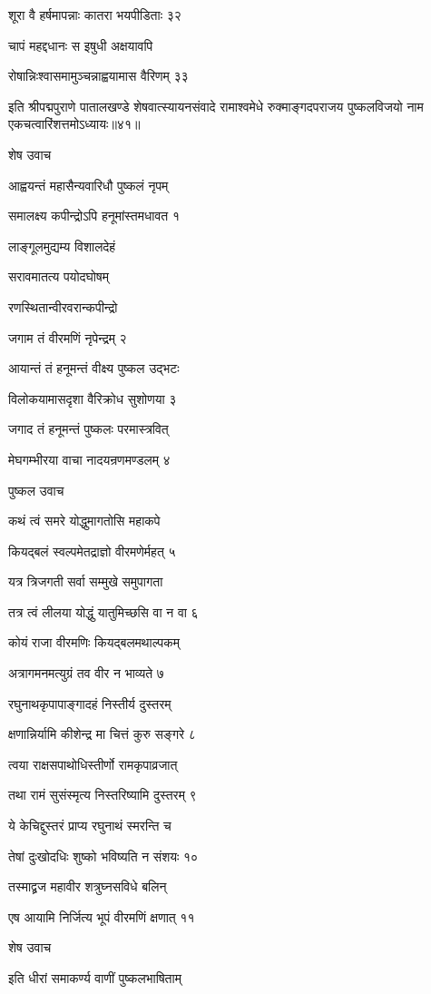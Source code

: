 शूरा वै हर्षमापन्नाः कातरा भयपीडिताः ३२

चापं महद्दधानः स इषुधी अक्षयावपि

रोषान्निःश्वासमामुञ्चन्नाह्वयामास वैरिणम् ३३

इति श्रीपद्मपुराणे पातालखण्डे शेषवात्स्यायनसंवादे रामाश्वमेधे रुक्माङ्गदपराजय पुष्कलविजयो नाम एकचत्वारिंशत्तमोऽध्यायः॥४१॥


शेष उवाच

आह्वयन्तं महासैन्यवारिधौ पुष्कलं नृपम्

समालक्ष्य कपीन्द्रोऽपि हनूमांस्तमधावत १

लाङ्गूलमुद्यम्य विशालदेहं

सरावमातत्य पयोदघोषम्

रणस्थितान्वीरवरान्कपीन्द्रो

जगाम तं वीरमणिं नृपेन्द्रम् २

आयान्तं तं हनूमन्तं वीक्ष्य पुष्कल उद्भटः

विलोकयामासदृशा वैरिक्रोध सुशोणया ३

जगाद तं हनूमन्तं पुष्कलः परमास्त्रवित्

मेघगम्भीरया वाचा नादयन्रणमण्डलम् ४

पुष्कल उवाच

कथं त्वं समरे योद्धुमागतोसि महाकपे

कियद्बलं स्वल्पमेतद्राज्ञो वीरमणेर्महत् ५

यत्र त्रिजगती सर्वा सम्मुखे समुपागता

तत्र त्वं लीलया योद्धुं यातुमिच्छसि वा न वा ६

कोयं राजा वीरमणिः कियद्बलमथाल्पकम्

अत्रागमनमत्युग्रं तव वीर न भाव्यते ७

रघुनाथकृपापाङ्गादहं निस्तीर्य दुस्तरम्

क्षणान्निर्यामि कीशेन्द्र मा चित्तं कुरु सङ्गरे ८

त्वया राक्षसपाथोधिस्तीर्णो रामकृपाव्रजात्

तथा रामं सुसंस्मृत्य निस्तरिष्यामि दुस्तरम् ९

ये केचिद्दुस्तरं प्राप्य रघुनाथं स्मरन्ति च

तेषां दुःखोदधिः शुष्को भविष्यति न संशयः १०

तस्माद्व्रज महावीर शत्रुघ्नसविधे बलिन्

एष आयामि निर्जित्य भूपं वीरमणिं क्षणात् ११

शेष उवाच

इति धीरां समाकर्ण्य वाणीं पुष्कलभाषिताम्

